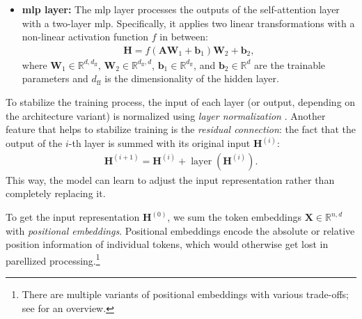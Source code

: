 {\begin{itemize}
\begin{align}
          \end{align}
          To capture different aspects of the input sequence, transformer uses multiple \emph{attention heads}. Each head $\mathcal{H}_k$ is parametrized by a set of attention matrices $\mathbf{W}^{(k)}_\mathbf{q}$,$\mathbf{W}^{(k)}_\mathbf{k}$, and $\mathbf{W}^{(k)}_\mathbf{v}$, computing the self-attention as described above. To compute the output of the self-attention layer, the output of each head is concatenated and linearly transformed using the trainable output matrix $\mathbf{W}_o$:
          \begin{align}
              \mathbf{A} = \operatorname{concat}(\operatorname{attn}_{\mathcal{H}_1}, \ldots, \operatorname{attn}_{\mathcal{H}_k})\mathbf{W}_o.
          \end{align}
    \item \textbf{\ac{mlp} layer:} The \ac{mlp} layer processes the outputs of the self-attention layer with a two-layer \ac{mlp}. Specifically, it applies two linear transformations with a non-linear activation function $f$ in between:
          \begin{align}
              \mathbf{H} = f(\mathbf{A}\mathbf{W}_1 + \mathbf{b}_1)\mathbf{W}_2 + \mathbf{b}_2,
          \end{align}
          where $\mathbf{W}_1 \in \mathbb{R}^{d,d_{\text{ff}}}$, $\mathbf{W}_2 \in \mathbb{R}^{d_{\text{ff}},d}$, $\mathbf{b}_1 \in \mathbb{R}^{d_{\text{ff}}}$, and $\mathbf{b}_2 \in \mathbb{R}^{d}$ are the trainable parameters and $d_{\text{ff}}$ is the dimensionality of the hidden layer.
\end{itemize}
To stabilize the training process, the input of each layer (or output, depending on the architecture variant) is normalized using \emph{layer normalization} \cite{ba2016layer}. Another feature that helps to stabilize training is the \emph{residual connection}: the fact that the output of the $i$-th layer is summed with its original input $\mathbf{H}^{(i)}$:
\begin{align}
    \mathbf{H}^{(i+1)} = \mathbf{H}^{(i)} + \operatorname{layer}(\mathbf{H}^{(i)}).
\end{align}
This way, the model can learn to adjust the input representation rather than completely replacing it.

To get the input representation $\mathbf{H}^{(0)}$, we sum the token embeddings $\mathbf{X} \in \mathbb{R}^{n,d}$ with \emph{positional embeddings}. Positional embeddings encode the absolute or relative position information of individual tokens, which would otherwise get lost in parellized processing.\footnote{There are multiple variants of positional embeddings with various trade-offs; see \citet{dufter2022position} for an overview.}



}
